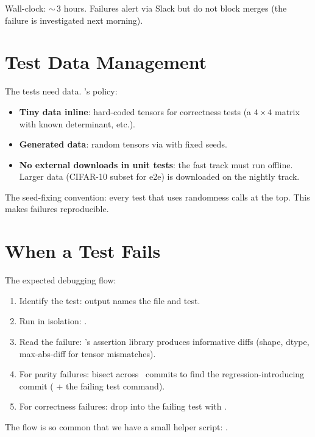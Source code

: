 Wall-clock: $\sim$\,3 hours. Failures alert via Slack but do
not block merges (the failure is investigated next morning).

\section{Test Data Management}
\label{sec:testing:test_data}

The tests need data. \Lucid's policy:

\begin{itemize}
  \item \textbf{Tiny data inline}: hard-coded tensors for
    correctness tests (a $4 \times 4$ matrix with known
    determinant, etc.).
  \item \textbf{Generated data}: random tensors via
     with fixed seeds.
  \item \textbf{No external downloads in unit tests}: the
    fast track must run offline. Larger data (CIFAR-10 subset
    for e2e) is downloaded on the nightly track.
\end{itemize}

The seed-fixing convention: every test that uses randomness
calls  at the top. This makes failures
reproducible.

\section{When a Test Fails}
\label{sec:testing:test_failure}

The expected debugging flow:

\begin{enumerate}
  \item Identify the test:  output names the file
    and test.
  \item Run in isolation:
    .
  \item Read the failure: \Lucid's assertion library produces
    informative diffs (shape, dtype, max-abs-diff for
    tensor mismatches).
  \item For parity failures: bisect across \Lucid\ commits to
    find the regression-introducing commit (
    + the failing test command).
  \item For correctness failures: drop into the failing test
    with .
\end{enumerate}

The  flow is so common that we have a small
helper script: .

